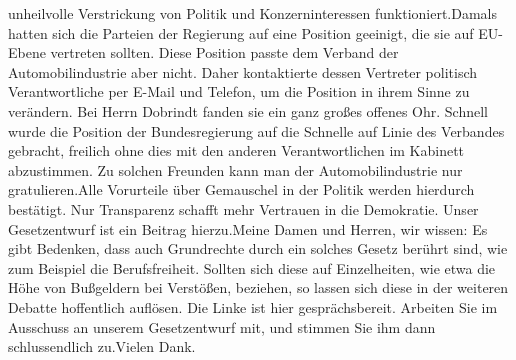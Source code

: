 \documentclass{article}
\begin{document}
unheilvolle Verstrickung von Politik und Konzerninteressen funktioniert.Damals hatten sich die Parteien der Regierung auf eine Position geeinigt, die sie auf EU-Ebene vertreten sollten. Diese Position passte dem Verband der Automobilindustrie aber nicht. Daher kontaktierte dessen Vertreter politisch Verantwortliche per E-Mail und Telefon, um die Position in ihrem Sinne zu verändern. Bei Herrn Dobrindt fanden sie ein ganz großes offenes Ohr. Schnell wurde die Position der Bundesregierung auf die Schnelle auf Linie des Verbandes gebracht, freilich ohne dies mit den anderen Verantwortlichen im Kabinett abzustimmen. Zu solchen Freunden kann man der Automobilindustrie nur gratulieren.Alle Vorurteile über Gemauschel in der Politik werden hierdurch bestätigt. Nur Transparenz schafft mehr Vertrauen in die Demokratie. Unser Gesetzentwurf ist ein Beitrag hierzu.Meine Damen und Herren, wir wissen: Es gibt Bedenken, dass auch Grundrechte durch ein solches Gesetz berührt sind, wie zum Beispiel die Berufsfreiheit. Sollten sich diese auf Einzelheiten, wie etwa die Höhe von Bußgeldern bei Verstößen, beziehen, so lassen sich diese in der weiteren Debatte hoffentlich auflösen. Die Linke ist hier gesprächsbereit. Arbeiten Sie im Ausschuss an unserem Gesetzentwurf mit, und stimmen Sie ihm dann schlussendlich zu.Vielen Dank.
\end{document}
